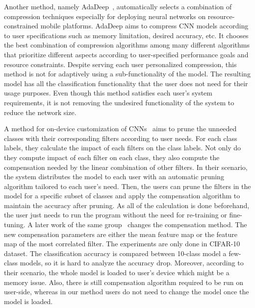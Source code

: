 Another method, namely AdaDeep~\cite{Liu2018OnDemandDM}, automatically selects a combination of compression techniques especially for deploying neural networks on resource-constrained mobile platforms. 
AdaDeep aims to compress CNN models according to user specifications such as memory limitation, desired accuracy, etc. 
It chooses the best combination of compression algorithms among many different algorithms that prioritize different aspects according to user-specified performance goals and resource constraints. 
Despite serving each user personalized compression, this method is not for adaptively using a sub-functionality of the model.
The resulting model has all the classification functionality that the user does not need for their usage purposes. 
Even though this method satisfies each user's system requirements, it is not removing the undesired functionality of the system to reduce the network size.

A method for on-device customization of CNNs~\cite{guo2017pruning2} aims to prune the unneeded classes with their corresponding filters according to user needs. 
For each class labels, they calculate the impact of each filters on the class labels. 
Not only do they compute impact of each filter on each class, they also compute the compensation needed by the linear combination of other filters.
In their scenario, the system distributes the model to each user with an automatic pruning algorithm tailored to each user's need. 
Then, the users can prune the filters in the model for a specific subset of classes and apply the compensation algorithm to maintain the accuracy after pruning. 
As all of the calculation is done beforehand, the user just needs to run the program without the need for re-training or fine-tuning.
A later work of the same group~\cite{guo2017pruning} changes the compensation method.
The new compensation parameters are either the mean feature map or the feature map of the most correlated filter.
The experiments are only done in CIFAR-10 dataset. The classification accuracy is compared between 10-class model a few-class models, so it is hard to analyze the accuracy drop.
Moreover, according to their scenario, the whole model is loaded to user's device which might be a memory issue.
Also, there is still compensation algorithm required to be run on user-side, whereas in our method users do not need to change the model once the model is loaded.

